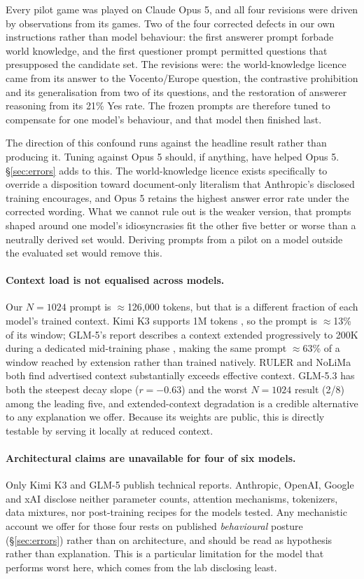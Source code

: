 \documentclass[11pt]{article}
\begin{document}
Every pilot game was played on Claude Opus 5, and all four revisions were
driven by observations from its games. Two of the four corrected defects in our
own instructions rather than model behaviour: the first answerer prompt forbade
world knowledge, and the first questioner prompt permitted questions that
presupposed the candidate set. The revisions were: the world-knowledge licence
came from its answer to the
Vocento/Europe question, the contrastive prohibition and its generalisation
from two of its questions, and the restoration of answerer reasoning from its
21\% Yes rate. The frozen prompts are therefore tuned to compensate for one
model's behaviour, and that model then finished last.

The direction of this confound runs against the headline result rather than
producing it. Tuning against Opus 5 should, if anything, have helped Opus 5.
\S\ref{sec:errors} adds to this. The world-knowledge licence exists
specifically to override a disposition toward document-only literalism that
Anthropic's disclosed training encourages, and Opus 5 retains the highest answer
error rate under the corrected wording. What we cannot rule out is the weaker
version, that prompts shaped around one model's idiosyncrasies fit the other
five better or worse than a neutrally derived set would. Deriving prompts from
a pilot on a model outside the evaluated set would remove this.

\paragraph{Context load is not equalised across models.} Our $N{=}1024$
prompt is $\approx$126{,}000 tokens, but that is a different fraction of each
model's trained context. Kimi K3 supports 1M tokens \citep{kimi2026k3}, so the
prompt is $\approx$13\% of its window; GLM-5's report describes a context
extended progressively to 200K during a dedicated mid-training phase
\citep{zhipu2026glm5}, making the same prompt $\approx$63\% of a window reached
by extension rather than trained natively. RULER \citep{hsieh2024} and NoLiMa
\citep{modarressi2025nolima} both find advertised context substantially exceeds
effective context. GLM-5.3 has both the steepest decay slope ($r=-0.63$) and
the worst $N{=}1024$ result (2/8) among the leading five, and extended-context
degradation is a credible alternative to any explanation we offer. Because its
weights are public, this is directly testable by serving it locally at reduced
context.

\paragraph{Architectural claims are unavailable for four of six models.} Only
Kimi K3 and GLM-5 publish technical reports. Anthropic, OpenAI, Google and xAI
disclose neither parameter counts, attention mechanisms, tokenizers, data
mixtures, nor post-training recipes for the models tested. Any mechanistic
account we offer for those four rests on published \emph{behavioural} posture
(\S\ref{sec:errors}) rather than on architecture, and should be read as
hypothesis rather than explanation. This is a particular limitation for the
model that performs worst here, which comes from the lab disclosing least.
\end{document}
